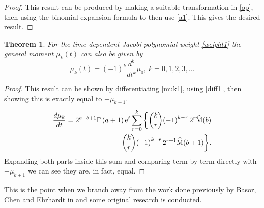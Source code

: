 \documentclass[12pt]{article}
\newtheorem{mydef}{Theorem}[section]
\numberwithin{figure}{section}
\numberwithin{equation}{section}
\numberwithin{table}{section}
\begin{document}
\begin{proof}
This result can be produced by making a suitable transformation in \eqref{op}, then using the binomial expansion formula to then use \eqref{a1}. This gives the desired result.
\end{proof}
\begin{mydef}
For the time-dependent Jacobi polynomial weight \eqref{weight1} the general moment $\mu_k(t)$ can also be given by
\begin{equation}\nonumber
\mu_k(t)=(-1)^k\frac{d^k}{dt^k}\mu_0,~k=0,1,2,3,...
\end{equation}
\end{mydef}
\begin{proof}
This result can be shown by differentiating \eqref{muk1}, using \eqref{diff1}, then showing this is exactly equal to $-\mu_{k+1}$.
\begin{align*}\nonumber
\frac{d\mu_k}{dt}={2}^{ a+ b+1}\Gamma  \left(  a+1 \right){{\rm e}^{t}}\sum _{r=0}^{k
}\bigg\{\binom{k}{r}{\left( -1
 \right) ^{k-r}{2}^{r}
{\widehat{\rm M}(b)}}\\-\binom{k}{r} {{\left( -1
 \right) ^{k-r}{2}^{r+1}
{\widehat{\rm M}(b+1)}}}\bigg\}.
\end{align*}
Expanding both parts inside this sum and comparing term by term directly with $-\mu_{k+1}$ we can see they are, in fact, equal.
\end{proof}
This is the point when we branch away from the work done previously by Basor, Chen and Ehrhardt in \cite{Basor} and some original research is conducted.
\end{document}
